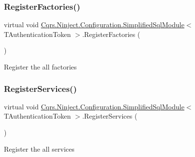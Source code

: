 \subsubsection{\texorpdfstring{Register\+Factories()}{RegisterFactories()}}
{\footnotesize\ttfamily virtual void \hyperlink{classCqrs_1_1Ninject_1_1Configuration_1_1SimplifiedSqlModule}{Cqrs.\+Ninject.\+Configuration.\+Simplified\+Sql\+Module}$<$ T\+Authentication\+Token $>$.Register\+Factories (\begin{DoxyParamCaption}{ }\end{DoxyParamCaption})\hspace{0.3cm}{\ttfamily [virtual]}}



Register the all factories 

\mbox{\label{classCqrs_1_1Ninject_1_1Configuration_1_1SimplifiedSqlModule_a61e712bdaa49aef7fc229e009d65d1fb_a61e712bdaa49aef7fc229e009d65d1fb}} 
\subsubsection{\texorpdfstring{Register\+Services()}{RegisterServices()}}
{\footnotesize\ttfamily virtual void \hyperlink{classCqrs_1_1Ninject_1_1Configuration_1_1SimplifiedSqlModule}{Cqrs.\+Ninject.\+Configuration.\+Simplified\+Sql\+Module}$<$ T\+Authentication\+Token $>$.Register\+Services (\begin{DoxyParamCaption}{ }\end{DoxyParamCaption})\hspace{0.3cm}{\ttfamily [virtual]}}



Register the all services 

